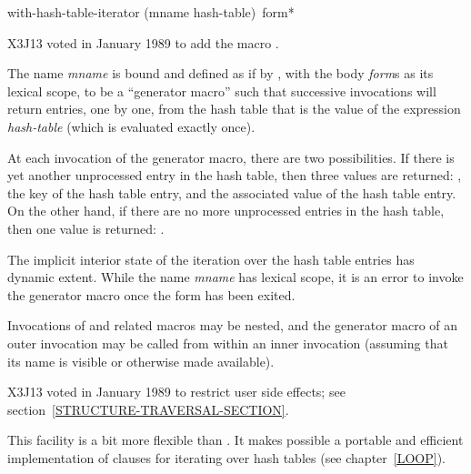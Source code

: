 \begin{new}
\begin{defmac}
with-hash-table-iterator (mname hash-table) {\,form}*

X3J13 voted in January 1989
to add the macro .

The name \emph{mname} is bound and defined as if by ,
with the body \emph{form\/}s as its lexical scope, to be a ``generator macro''
such that successive invocations  will
return entries, one by one, from the hash table that is the value of the
expression \emph{hash-table} (which is evaluated exactly once).

At each invocation of the generator macro, there are two possibilities.
If there is yet another unprocessed entry in the hash table, then
three values are returned: ,
the key of the hash table entry, and
the associated value of the hash table entry.
On the other hand, if there are no more unprocessed entries in the
hash table, then one value is returned: .

The implicit interior state of the iteration over the hash table
entries has dynamic extent.  While the name \emph{mname} has
lexical scope, it is an error to invoke the generator macro
once the  form has been exited.

Invocations of 
and related macros may be nested, and the generator macro of an
outer invocation may be called from within an inner invocation
(assuming that its name is visible or otherwise made available).

\begin{new}
X3J13 voted in January 1989
to restrict user side effects; see section~\ref{STRUCTURE-TRAVERSAL-SECTION}.
\end{new}

\beforenoterule
\begin{rationale}
This facility is a bit more flexible than .
It makes possible a portable and efficient implementation of 
clauses for iterating over hash tables (see chapter~\ref{LOOP}).
\end{rationale}
\afternoterule
\end{defmac}

\newpage%


\end{new}
